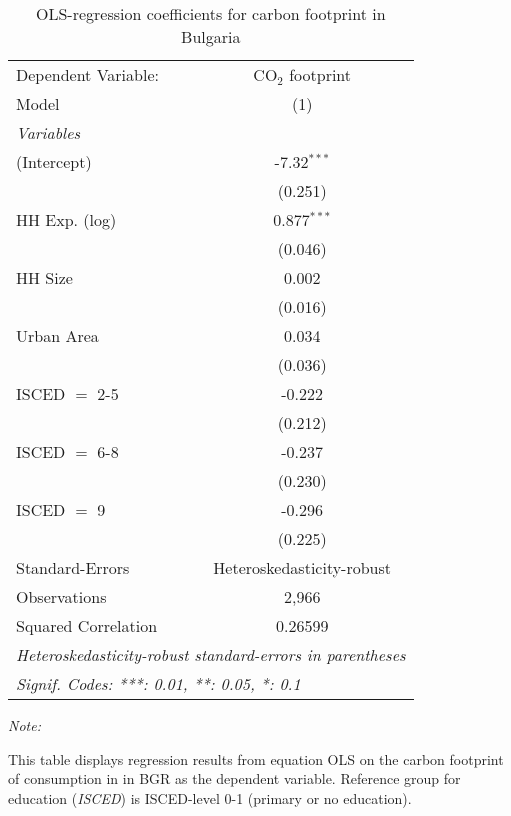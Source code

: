 
\begin{table}[htbp!]
   \centering
   \small
   \begin{adjustbox}{width = 1\textwidth, max height = 0.95\textheight, center}
      \begin{threeparttable}[b]
         \caption{\label{tab:OLS_2_BGR} OLS-regression coefficients for carbon footprint in Bulgaria}
         \begin{tabular}{lc}
            \tabularnewline \midrule \midrule
            Dependent Variable: & CO$_{2}$ footprint\\  
            Model               & (1)\\  
            \midrule
            \emph{Variables}\\
            (Intercept)         & -7.32$^{***}$\\   
                                & (0.251)\\   
            HH Exp. (log)       & 0.877$^{***}$\\   
                                & (0.046)\\   
            HH Size             & 0.002\\   
                                & (0.016)\\   
            Urban Area          & 0.034\\   
                                & (0.036)\\   
            ISCED $=$ 2-5       & -0.222\\   
                                & (0.212)\\   
            ISCED $=$ 6-8       & -0.237\\   
                                & (0.230)\\   
            ISCED $=$ 9         & -0.296\\   
                                & (0.225)\\   
            \midrule 
            Standard-Errors     & Heteroskedasticity-robust \\   
            Observations        & 2,966\\  
            Squared Correlation & 0.26599\\  
            \midrule \midrule
            \multicolumn{2}{l}{\emph{Heteroskedasticity-robust standard-errors in parentheses}}\\
            \multicolumn{2}{l}{\emph{Signif. Codes: ***: 0.01, **: 0.05, *: 0.1}}\\
         \end{tabular}
         
         \begin{tablenotes}\item \medskip \textit{Note:}
            \item This table displays regression results from equation OLS on the carbon footprint of consumption in  in BGR as the dependent variable.  Reference group for education (\textit{ISCED}) is ISCED-level 0-1 (primary or no education).
         \end{tablenotes}
      \end{threeparttable}
   \end{adjustbox}
\end{table}


